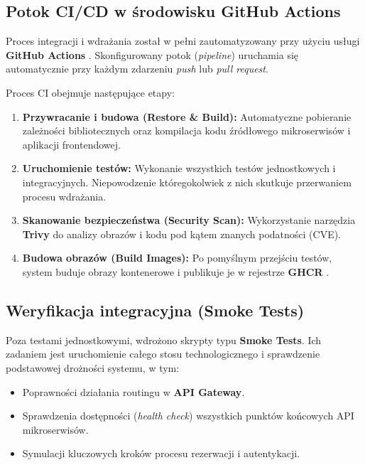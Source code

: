 \subsection{Potok CI/CD w środowisku GitHub Actions}
Proces integracji i wdrażania został w pełni zautomatyzowany przy użyciu usługi \textbf{GitHub Actions} \cite{github_actions_docs}. Skonfigurowany potok (\textit{pipeline}) uruchamia się automatycznie przy każdym zdarzeniu \textit{push} lub \textit{pull request}.



Proces CI obejmuje następujące etapy:
\begin{enumerate}
    \item \textbf{Przywracanie i budowa (Restore \& Build):} Automatyczne pobieranie zależności bibliotecznych oraz kompilacja kodu źródłowego mikroserwisów i aplikacji frontendowej.
    \item \textbf{Uruchomienie testów:} Wykonanie wszystkich testów jednostkowych i integracyjnych. Niepowodzenie któregokolwiek z nich skutkuje przerwaniem procesu wdrażania.
    \item \textbf{Skanowanie bezpieczeństwa (Security Scan):} Wykorzystanie narzędzia \textbf{Trivy} \cite{trivy_security} do analizy obrazów i kodu pod kątem znanych podatności (CVE).
    \item \textbf{Budowa obrazów (Build Images):} Po pomyślnym przejściu testów, system buduje obrazy kontenerowe i publikuje je w rejestrze \textbf{GHCR} \cite{ghcr_guide}.
\end{enumerate}

\subsection{Weryfikacja integracyjna (Smoke Tests)}
Poza testami jednostkowymi, wdrożono skrypty typu \textbf{Smoke Tests}. Ich zadaniem jest uruchomienie całego stosu technologicznego i sprawdzenie podstawowej drożności systemu, w tym:
\begin{itemize}
    \item Poprawności działania routingu w \textbf{API Gateway}.
    \item Sprawdzenia dostępności (\textit{health check}) wszystkich punktów końcowych API mikroserwisów.
    \item Symulacji kluczowych kroków procesu rezerwacji i autentykacji.
\end{itemize}